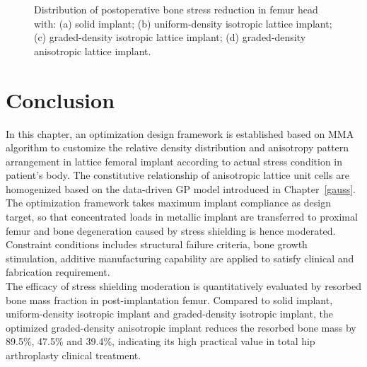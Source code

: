 \documentclass[12pt]{extbook}
\begin{document}
\begin{figure}[htbp]
\caption{Distribution of postoperative bone stress reduction in femur head with: (a) solid implant; (b) uniform-density isotropic lattice implant; (c) graded-density isotropic lattice implant; (d) graded-density anisotropic lattice implant.}
\label{mbr_femur}
\end{figure}

\section{Conclusion}
\label{femur_conc}

In this chapter, an optimization design framework is established based on MMA algorithm to customize the relative density distribution and anisotropy pattern arrangement in lattice femoral implant according to actual stress condition in patient's body. The constitutive relationship of anisotropic lattice unit cells are homogenized based on the data-driven GP model introduced in Chapter~\ref{gauss}.\\

The optimization framework takes maximum implant compliance as design target, so that concentrated loads in metallic implant are transferred to proximal femur and bone degeneration caused by stress shielding is hence moderated. Constraint conditions includes structural failure criteria, bone growth stimulation, additive manufacturing capability are applied to satisfy clinical and fabrication requirement.\\

The efficacy of stress shielding moderation is quantitatively evaluated by resorbed bone mass fraction in post-implantation femur. Compared to solid implant, uniform-density isotropic implant and graded-density isotropic implant, the optimized graded-density anisotropic implant reduces the resorbed bone mass by 89.5\%, 47.5\% and 39.4\%, indicating its high practical value in total hip arthroplasty clinical treatment.\\
\end{document}
